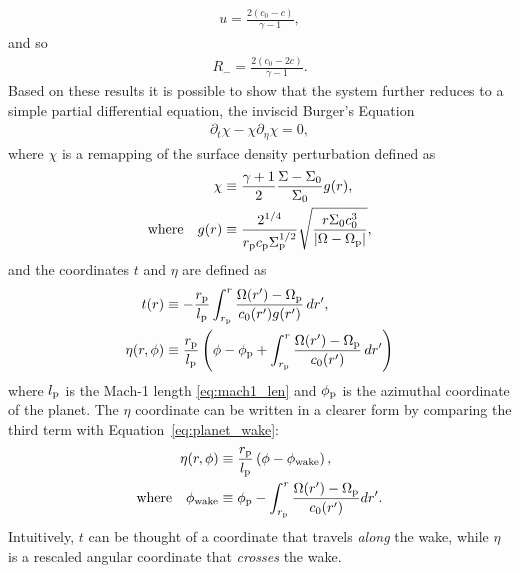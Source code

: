 \begin{align}
    u = \frac{2(c_0 - c)}{\gamma -1},
\end{align}
and so 
\begin{align}
    R_- = \frac{2(c_0 - 2c)}{\gamma -1}.
\end{align}
Based on these results it is possible to show that the system further reduces to a simple partial differential equation, the inviscid Burger's Equation~\citep[see appendix A of][]{rafikov2002a}
\begin{align}
    \partial_t \chi - \chi \partial_\eta \chi = 0, \label{eq:burgers}
\end{align}
where $\chi$ is a remapping of the surface density perturbation defined as 
\begin{align}
    \chi &\equiv \frac{\gamma +1}{2} \frac{\Sigma - \Sigma_0}{\Sigma_0} g(r), \label{eq:chi} \\
    {\rm where} \quad g(r) &\equiv \frac{2^{1/4}}{r_{\rm p} c_{\rm p} \Sigma_{\rm p}^{1/2}} \sqrt{\frac{r \Sigma_0 c_0^3}{|\Omega - \Omega_{\rm p}|}}, \label{eq:g}
\end{align}
and the coordinates $t$ and $\eta$ are defined as
\begin{align}
    t(r) &\equiv - \frac{r_{\rm p}}{l_{\rm p}} \int_{r_{\rm p}}^r \frac{\Omega(r') - \Omega_{\rm p}}{c_0(r') g(r')} \, dr', \label{eq:t} \\
    \eta(r,\phi) &\equiv \frac{r_{\rm p}}{l_{\rm p}} \left( \phi - \phi_{\rm p} + \int_{r_{\rm p}}^r \frac{\Omega(r') - \Omega_{\rm p}}{c_0(r')} \, dr'  \right) \label{eq:eta}
\end{align}
where $l_{\rm p}$ is the Mach-1 length \eqref{eq:mach1_len} and $\phi_{\rm p}$ is the azimuthal coordinate of the planet.
The $\eta$ coordinate can be written in a clearer form by comparing the third term with Equation~\eqref{eq:planet_wake}:
\begin{align}
    \eta(r,\phi) &\equiv \frac{r_{\rm p}}{l_{\rm p}} \left( \phi - \phi_{\rm wake} \right), \\
    \rm{where} \quad \phi_{\rm wake} &\equiv \phi_{\rm p} - \int_{r_{\rm p}}^r \frac{\Omega(r') - \Omega_{\rm p}}{c_0(r')} dr'. \label{eq:phi_wake}
\end{align}
Intuitively, $t$ can be thought of a coordinate that travels \textit{along} the wake, while $\eta$ is a rescaled angular coordinate that \textit{crosses} the wake.

